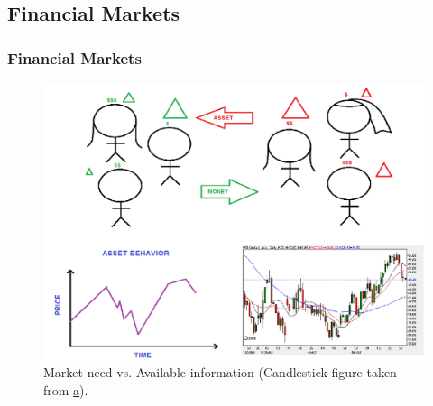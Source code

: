 \documentclass{beamer}
\begin{document}
\subsection{Financial Markets}
\begin{frame}
\frametitle{Financial Markets}

\begin{figure}
	\centering
		\includegraphics[scale=0.5]{GeneralMarketDescription.png}
	\caption{Market need vs. Available information (Candlestick figure taken from \href{http://stackoverflow.com/questions/12173306/jfreechart-timeseries-and-candlestick-on-the-same-chart}a).}
	\label{fig:GeneralMarketDescription}
\end{figure}
\end{frame}
\end{document}
